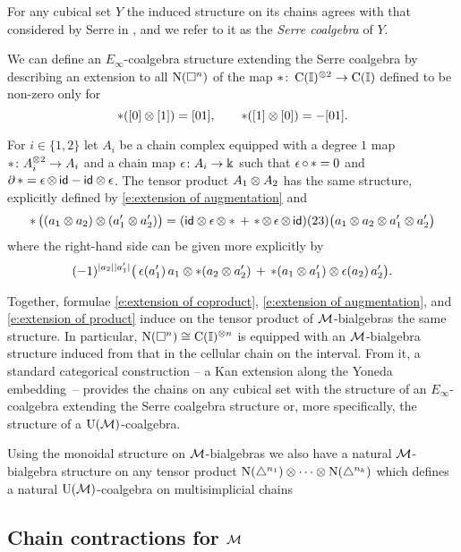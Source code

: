 For any cubical set $Y$ the induced structure on its chains agrees with that considered by Serre in \cite{serre1951homologie}, and we refer to it as the \textit{Serre coalgebra} of $Y$.

We can define an $E_\infty$-coalgebra structure extending the Serre coalgebra by describing an extension to all $\operatorname{N}(\square^n)$ of the map $\ast \colon \operatorname{C}(\mathbb{I})^{\otimes 2} \to \operatorname{C}(\mathbb{I})$ defined to be non-zero only for
\[
\ast([0] \otimes [1]) = [01], \qquad
\ast([1] \otimes [0]) = - [01].
\]

For $i \in \{1,2\}$ let $A_i$ be a chain complex equipped with a degree $1$ map $\operatorname{\ast} \colon A_i^{\otimes 2} \to A_i$ and a chain map $\operatorname{\epsilon} \colon A_i \to \Bbbk$ such that $\operatorname{\epsilon} \circ \operatorname{\ast} = 0$ and $\partial \operatorname{\ast} = \operatorname{\epsilon} \otimes \, \mathsf{id} - \mathsf{id} \otimes \operatorname{\epsilon}$.
The tensor product $A_1 \otimes A_2$ has the same structure, explicitly defined by \eqref{e:extension of augmentation} and
\begin{equation} \label{e:extension of product}
\operatorname{\ast} \big( (a_1 \otimes a_2) \otimes (a_1^\prime \otimes a_2^\prime)\big) =
(\mathsf{id} \otimes \operatorname{\epsilon} \otimes \ast \, + \, \operatorname{\ast} \otimes \operatorname{\epsilon} \otimes \, \mathsf{id})(23)
\big( a_1 \otimes a_2 \otimes a_1^\prime \otimes a_2^\prime \big)
\end{equation}
where the right-hand side can be given more explicitly by
\[
(-1)^{\lvert a_2\rvert \lvert a_1^\prime\rvert} \big( \operatorname{\epsilon}(a_1^\prime) \, a_1 \otimes \ast (a_2 \otimes a_2^\prime)  \, + \, \operatorname{\ast}(a_1 \otimes a_1^\prime) \otimes \operatorname{\epsilon}(a_2) \, a_2^\prime \big).
\]

Together, formulae \eqref{e:extension of coproduct}, \eqref{e:extension of augmentation}, and \eqref{e:extension of product} induce on the tensor product of $\operatorname{\mathcal{M}}$-bialgebras the same structure.
In particular, $\operatorname{N}(\square^n) \cong \operatorname{C}(\mathbb{I})^{\otimes n}$ is equipped with an $\operatorname{\mathcal{M}}$-bialgebra structure induced from that in the cellular chain on the interval.
From it, a standard categorical construction -- a Kan extension along the Yoneda embedding~-- provides the chains on any cubical set with the structure of an $E_\infty$-coalgebra extending the Serre coalgebra structure or, more specifically, the structure of a $\operatorname{\mathrm{U}(\mathcal{M})}$-coalgebra.

Using the monoidal structure on $\operatorname{\mathcal{M}}$-bialgebras we also have a natural $\operatorname{\mathcal{M}}$-bialgebra structure on any tensor product $\operatorname{N}(\triangle^{n_1}) \otimes \dots \otimes \operatorname{N}(\triangle^{n_k})$ which defines a natural $\operatorname{\mathrm{U}(\mathcal{M})}$-coalgebra on multisimplicial chains \cite{gugenheim1957supercomplexes, salvatore2020multisimplicial}

\subsection{Chain contractions for $\operatorname{\mathcal{M}}$} \label{ss:homology of M}

